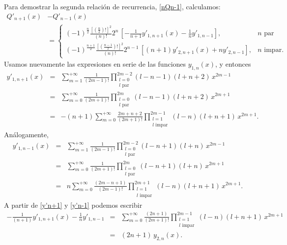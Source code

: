 Para demostrar la segunda relación de recurrencia, \eqref{nQn-1}, calculamos:
\begin{align}
Q'_{n+1}(x) &- Q'_{n-1}(x) \\
&=\begin{cases}
	(-1)^{\frac{n}{2}}\frac{[(\frac{n}{2})!]^2}{(n)!} 2^{n} \, \left[ -\frac{1}{n+1}y'_{1,n+1}(x)-\frac{1}{n}y'_{1,n-1} \right], & n \text{ par}\\
	(-1)^{\frac{n+1}{2}}\frac{\left[\left(\frac{n-1}{2}\right)!\right]^2}{(n)!}2^{n-1}\,\left[ (n+1)y'_{2,n+1}(x)+ny'_{2,n-1} \right] , & n \text{ impar}.
	\end{cases} \label{q'}
\end{align}
Usamos nuevamente las expresiones en serie de las funciones $y_{1,n}(x)$, y entonces
\begin{eqnarray}
y'_{1,n+1}(x)&=&\sum_{m= 1}^{+\infty}\frac{1}{(2m-1)!}
\prod_{\substack{l=0 \\ l \text{ par}}}^{2m-2}
(l-n-1)(l+n+2)\,x^{2m-1} \\
&=&\sum_{m= 0}^{+\infty}\frac{1}{(2m+1)!}
\prod_{\substack{l=0 \\ l \text{ par}}}^{2m}
(l-n-1)(l+n+2)\,x^{2m+1} \\
&=&-(n+1)\sum_{m= 0}^{+\infty}\frac{2m+n+2}{(2m+1)!}
\prod_{\substack{l=1 \\ l \text{ impar}}}^{2m-1}
(l-n)(l+n+1)\,x^{2m+1}. \label{y'n+1}
\end{eqnarray}
Análogamente,
\begin{eqnarray}
y'_{1,n-1}(x)&=&\sum_{m= 1}^{+\infty}\frac{1}{(2m-1)!}
\prod_{\substack{l=0 \\ l \text{ par}}}^{2m-2}
(l-n+1)(l+n)\,x^{2m-1} \\
&=&\sum_{m= 0}^{+\infty}\frac{1}{(2m+1)!}
\prod_{\substack{l=0 \\ l \text{ par}}}^{2m}
(l-n+1)(l+n)\,x^{2m+1} \\
&=&n\sum_{m= 0}^{+\infty}\frac{(2m-n+1)}{(2m-1)!}
\prod_{\substack{l=1 \\ l \text{ impar}}}^{2m+1}
(l-n)(l+n+1)\,x^{2m+1}. \label{y'n-1}
\end{eqnarray}
A partir de \eqref{y'n+1} y \eqref{y'n-1} podemos escribir
\begin{eqnarray}
-\frac{1}{(n+1)}y'_{1,n+1}(x)-\frac{1}{n}y'_{1,n-1}&=&\sum_{m= 0}^{+\infty}\frac{(2n+1)}{(2m+1)!}
\prod_{\substack{l=1 \\ l \text{ impar}}}^{2m-1}
(l-n)(l+n+1)\,x^{2m+1}\\
&=&(2n+1)\,y_{2,n}(x). \label{2n-1y2}
\end{eqnarray}

